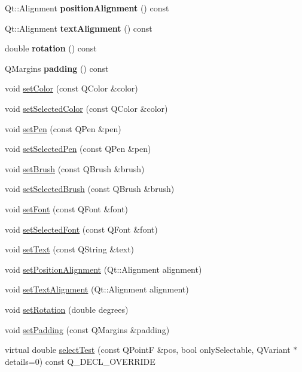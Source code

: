 \begin{DoxyCompactItemize}
Qt\+::\+Alignment {\bfseries position\+Alignment} () const
\item 
\mbox{\label{class_q_c_p_item_text_a9af3198d46551e1cc7703f02c95ddfe5}} 
Qt\+::\+Alignment {\bfseries text\+Alignment} () const
\item 
\mbox{\label{class_q_c_p_item_text_a035962b4ed23ff0a89e6a8b46fa18bf1}} 
double {\bfseries rotation} () const
\item 
\mbox{\label{class_q_c_p_item_text_a5a598618350b40446d031fa9dc15fba7}} 
Q\+Margins {\bfseries padding} () const
\item 
void \hyperlink{class_q_c_p_item_text_aa51efc0841fe52da9eaf8aff6fc8a8b2}{set\+Color} (const Q\+Color \&color)
\item 
void \hyperlink{class_q_c_p_item_text_ae7ba0bdb75c897b028388e45bfd435fa}{set\+Selected\+Color} (const Q\+Color \&color)
\item 
void \hyperlink{class_q_c_p_item_text_a9b9ec6eea0eb0603977ff84d4c78d0a3}{set\+Pen} (const Q\+Pen \&pen)
\item 
void \hyperlink{class_q_c_p_item_text_a291febe586f0da3f1c392e77bef4aa20}{set\+Selected\+Pen} (const Q\+Pen \&pen)
\item 
void \hyperlink{class_q_c_p_item_text_a1c7e131516df2ed8d941ef31240ded8e}{set\+Brush} (const Q\+Brush \&brush)
\item 
void \hyperlink{class_q_c_p_item_text_a6b8377eeb2af75eb9528422671ac16cb}{set\+Selected\+Brush} (const Q\+Brush \&brush)
\item 
void \hyperlink{class_q_c_p_item_text_a94ad60ebe04f5c07c35e7c2029e96b1f}{set\+Font} (const Q\+Font \&font)
\item 
void \hyperlink{class_q_c_p_item_text_a0be2841772f83663c4db307928b82816}{set\+Selected\+Font} (const Q\+Font \&font)
\item 
void \hyperlink{class_q_c_p_item_text_a3dacdda0ac88f99a05b333b977c48747}{set\+Text} (const Q\+String \&text)
\item 
void \hyperlink{class_q_c_p_item_text_a781cdf8c640fc6a055dcff1e675c8c7a}{set\+Position\+Alignment} (Qt\+::\+Alignment alignment)
\item 
void \hyperlink{class_q_c_p_item_text_ab5bc0684c4d1bed81949a11b34dba478}{set\+Text\+Alignment} (Qt\+::\+Alignment alignment)
\item 
void \hyperlink{class_q_c_p_item_text_a4bcc10cd97952c3f749d75824b5077f0}{set\+Rotation} (double degrees)
\item 
void \hyperlink{class_q_c_p_item_text_aeea8a3e01f135f9dd0bb08f51db66310}{set\+Padding} (const Q\+Margins \&padding)
\item 
virtual double \hyperlink{class_q_c_p_item_text_a676aaec10ad3cc4d7d0e4847db04c838}{select\+Test} (const Q\+PointF \&pos, bool only\+Selectable, Q\+Variant $\ast$details=0) const Q\+\_\+\+D\+E\+C\+L\+\_\+\+O\+V\+E\+R\+R\+I\+DE
\end{DoxyCompactItemize}
